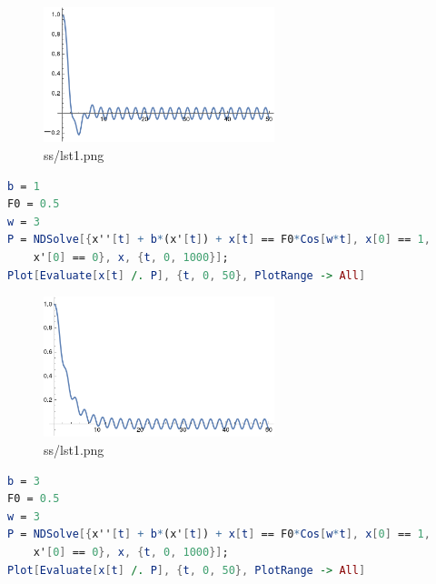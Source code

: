 \documentclass[12pt,letter]{article}
\begin{document}
{\begin{tcolorbox}
	\begin{figure}[H]
		\centering
		\includegraphics[width=0.6\textwidth]{ss/sshw4/3.png}
		\caption{ss/lst1.png}
		\label{fig:ss-lst1-png}
	\end{figure}
\begin{lstlisting}[language=Mathematica]
b = 1
F0 = 0.5
w = 3
P = NDSolve[{x''[t] + b*(x'[t]) + x[t] == F0*Cos[w*t], x[0] == 1, 
    x'[0] == 0}, x, {t, 0, 1000}];
Plot[Evaluate[x[t] /. P], {t, 0, 50}, PlotRange -> All]
\end{lstlisting}
\end{tcolorbox}

\begin{tcolorbox}
	\begin{figure}[H]
		\centering
		\includegraphics[width=0.6\textwidth]{ss/sshw4/4.png}
		\caption{ss/lst1.png}
		\label{fig:ss-lst1-png}
	\end{figure}
\begin{lstlisting}[language=Mathematica]
b = 3
F0 = 0.5
w = 3
P = NDSolve[{x''[t] + b*(x'[t]) + x[t] == F0*Cos[w*t], x[0] == 1, 
    x'[0] == 0}, x, {t, 0, 1000}];
Plot[Evaluate[x[t] /. P], {t, 0, 50}, PlotRange -> All]
\end{lstlisting}
\end{tcolorbox}


\newpage
}
\end{document}
